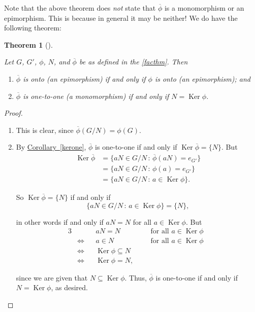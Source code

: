 \documentclass[10pt,]{book}
\theoremstyle{plain}
\newtheorem{theorem}{Theorem}[section]
\theoremstyle{definition}
\theoremstyle{definition}
\theoremstyle{definition}
\theoremstyle{definition}
\numberwithin{equation}{section}
\def\phibar{\overline{\phi}}
\DeclareMathOperator{\Ker}{Ker}
\newcommand{\amp}{ & }
\begin{document}
    Note that the above theorem does \emph{not} state that
    \(\phibar\) is a monomorphism or an epimorphism. This is because in
    general it may be neither! We do have the following theorem:
\begin{theorem}[{}]\label{epimono}

        Let \(G\), \(G'\), \(\phi\), \(N\), and \(\phibar\) be as
        defined in the  \hyperref[facthm]{\ref{facthm}}. Then
        \leavevmode%
\begin{enumerate}
\item\hypertarget{li-506}{}
              \(\phibar\) is onto (an epimorphism) if and only if \(\phi\) is onto
              (an epimorphism); and
\item\hypertarget{li-507}{}
              \(\phibar\) is one-to-one (a monomorphism) if and only if \(N=\Ker
              \phi\).
\end{enumerate}

\end{theorem}
\begin{proof}\hypertarget{proof-52}{}
\leavevmode%
\begin{enumerate}
\item\hypertarget{li-508}{}
          This is clear, since
          \(\phibar(G/N)=\phi(G)\).
\item\hypertarget{li-509}{}
          By \hyperref[kerone]{Corollary~\ref{kerone}}, \(\phibar\) is one-to-one if and only if \(\Ker
          \phibar=\{N\}\).  But
\begin{align*}
\Ker \phibar\amp =\{aN\in G/N
            \,:\, \phibar(aN)=e_{G'}\}\\
\amp =\{aN\in G/N \,:\,
            \phi(a)=e_{G'}\}\\
\amp =\{aN\in G/N \,:\, a\in
            \Ker\phi\}.
\end{align*}

          So \(\Ker \phibar = \{N\}\) if and only if
\begin{equation*}

            \{aN\in G/N\,:\,a\in \Ker\phi\}=\{N\},
          
\end{equation*}

          in other words if and
          only if \(aN=N\) for all \(a\in \Ker\phi\).  But
\begin{align*}
{3}
            \amp \amp \amp aN=N \amp \amp \ \ \text{ for all \(a\in \Ker\phi\) }\\
\amp \Leftrightarrow  \amp \amp  a\in N \amp \amp \ \ \text{ for all \(a\in \Ker\phi\) }\\
\amp \Leftrightarrow  \amp \amp  \Ker \phi\subseteq N\amp \amp\\
\amp \Leftrightarrow  \amp \amp  \Ker\phi=N,\amp \amp
\end{align*}

          since we are given that
          \(N\subseteq \Ker \phi\). Thus, \(\phibar\) is one-to-one
          if and only if \(N=\Ker\phi\), as desired. 
\end{enumerate}
\end{proof}
\par
\end{document}
